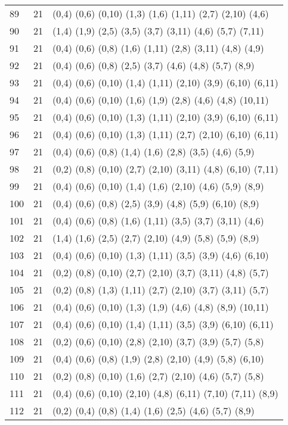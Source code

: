 {\begin{longtable}{lll}
89  & 21 & (0,4) (0,6) (0,10) (1,3) (1,6) (1,11) (2,7) (2,10) (4,6) \\
90  & 21 & (1,4) (1,9) (2,5) (3,5) (3,7) (3,11) (4,6) (5,7) (7,11) \\
91  & 21 & (0,4) (0,6) (0,8) (1,6) (1,11) (2,8) (3,11) (4,8) (4,9) \\
92  & 21 & (0,4) (0,6) (0,8) (2,5) (3,7) (4,6) (4,8) (5,7) (8,9) \\
93  & 21 & (0,4) (0,6) (0,10) (1,4) (1,11) (2,10) (3,9) (6,10) (6,11) \\
94  & 21 & (0,4) (0,6) (0,10) (1,6) (1,9) (2,8) (4,6) (4,8) (10,11) \\
95  & 21 & (0,4) (0,6) (0,10) (1,3) (1,11) (2,10) (3,9) (6,10) (6,11) \\
96  & 21 & (0,4) (0,6) (0,10) (1,3) (1,11) (2,7) (2,10) (6,10) (6,11) \\
97  & 21 & (0,4) (0,6) (0,8) (1,4) (1,6) (2,8) (3,5) (4,6) (5,9) \\
98  & 21 & (0,2) (0,8) (0,10) (2,7) (2,10) (3,11) (4,8) (6,10) (7,11) \\
99  & 21 & (0,4) (0,6) (0,10) (1,4) (1,6) (2,10) (4,6) (5,9) (8,9) \\
100 & 21 & (0,4) (0,6) (0,8) (2,5) (3,9) (4,8) (5,9) (6,10) (8,9) \\
101 & 21 & (0,4) (0,6) (0,8) (1,6) (1,11) (3,5) (3,7) (3,11) (4,6) \\
102 & 21 & (1,4) (1,6) (2,5) (2,7) (2,10) (4,9) (5,8) (5,9) (8,9) \\
103 & 21 & (0,4) (0,6) (0,10) (1,3) (1,11) (3,5) (3,9) (4,6) (6,10) \\
104 & 21 & (0,2) (0,8) (0,10) (2,7) (2,10) (3,7) (3,11) (4,8) (5,7) \\
105 & 21 & (0,2) (0,8) (1,3) (1,11) (2,7) (2,10) (3,7) (3,11) (5,7) \\
106 & 21 & (0,4) (0,6) (0,10) (1,3) (1,9) (4,6) (4,8) (8,9) (10,11) \\
107 & 21 & (0,4) (0,6) (0,10) (1,4) (1,11) (3,5) (3,9) (6,10) (6,11) \\
108 & 21 & (0,2) (0,6) (0,10) (2,8) (2,10) (3,7) (3,9) (5,7) (5,8) \\
109 & 21 & (0,4) (0,6) (0,8) (1,9) (2,8) (2,10) (4,9) (5,8) (6,10) \\
110 & 21 & (0,2) (0,8) (0,10) (1,6) (2,7) (2,10) (4,6) (5,7) (5,8) \\
111 & 21 & (0,4) (0,6) (0,10) (2,10) (4,8) (6,11) (7,10) (7,11) (8,9) \\
112 & 21 & (0,2) (0,4) (0,8) (1,4) (1,6) (2,5) (4,6) (5,7) (8,9) \\

\end{longtable}}
